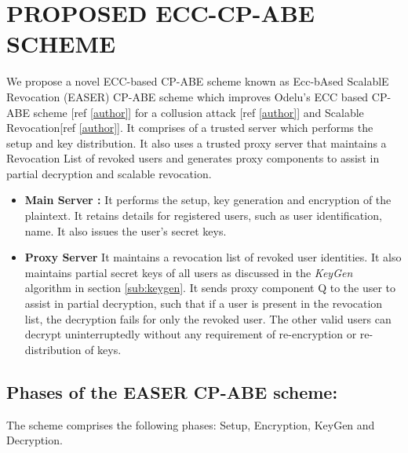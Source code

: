 \documentclass[conference]{IEEEtran}
\begin{document}
\section{\textbf{PROPOSED ECC-CP-ABE SCHEME}}

We propose a novel ECC-based CP-ABE scheme known as Ecc-bAsed ScalablE Revocation (EASER) CP-ABE scheme which improves Odelu's ECC based CP-ABE scheme [ref \ref{author}] for a collusion attack [ref \ref{author}] and Scalable Revocation[ref \ref{author}]. It comprises of a trusted server which performs the setup and key distribution. It also uses a trusted proxy server that maintains a Revocation List of revoked users and generates proxy components to assist in partial decryption and scalable revocation.
\begin{itemize}
    \item{\textbf{Main Server :}}
          It performs the setup, key generation and encryption of the plaintext. It retains details for registered users, such as user identification, name. It also issues the user's secret keys.

    \item{\textbf{Proxy Server }}
          It maintains a revocation list of revoked user identities.
          It also maintains partial secret keys of all users as discussed in the \emph{KeyGen} algorithm in section \ref{sub:keygen}. It sends proxy component Q to the user to assist in partial decryption, such that if a user is present in the revocation list, the decryption fails for only the revoked user. The other valid users can decrypt uninterruptedly without any requirement of re-encryption or re-distribution of keys.
\end{itemize}

\subsection{\textbf{Phases of the EASER CP-ABE scheme:}}
The scheme comprises the following phases: Setup, Encryption, KeyGen and Decryption.

\end{document}
